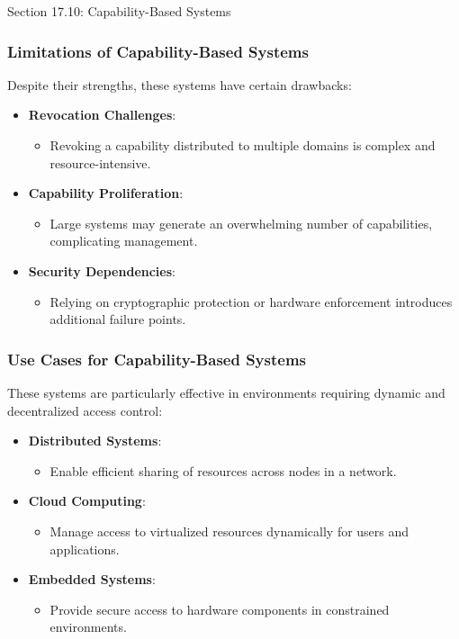 \begin{notes}{Section 17.10: Capability-Based Systems}
    \subsubsection*{Limitations of Capability-Based Systems}
    
    Despite their strengths, these systems have certain drawbacks:
    \begin{itemize}
        \item \textbf{Revocation Challenges}:
        \begin{itemize}
            \item Revoking a capability distributed to multiple domains is complex and resource-intensive.
        \end{itemize}
        \item \textbf{Capability Proliferation}:
        \begin{itemize}
            \item Large systems may generate an overwhelming number of capabilities, complicating management.
        \end{itemize}
        \item \textbf{Security Dependencies}:
        \begin{itemize}
            \item Relying on cryptographic protection or hardware enforcement introduces additional failure points.
        \end{itemize}
    \end{itemize}
    
    \subsubsection*{Use Cases for Capability-Based Systems}
    
    These systems are particularly effective in environments requiring dynamic and decentralized access control:
    \begin{itemize}
        \item \textbf{Distributed Systems}:
        \begin{itemize}
            \item Enable efficient sharing of resources across nodes in a network.
        \end{itemize}
        \item \textbf{Cloud Computing}:
        \begin{itemize}
            \item Manage access to virtualized resources dynamically for users and applications.
        \end{itemize}
        \item \textbf{Embedded Systems}:
        \begin{itemize}
            \item Provide secure access to hardware components in constrained environments.
        \end{itemize}
    \end{itemize}
    

\end{notes}
